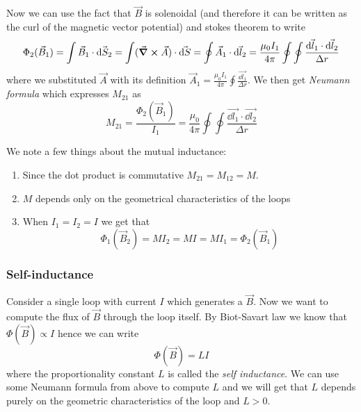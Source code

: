 \documentclass[12pt]{extarticle}
\begin{document}
Now we can use the fact that $\vec B$ is solenoidal (and therefore it can be written as the curl of the magnetic vector potential)
and stokes theorem to write
\begin{equation}
    \Phi_2(\vec B_1) = \int \vec B_1 \cdot \vec{\dd S_2} = \int (\curl \vec A) \cdot \vec{\dd S}
    = \oint \vec A_1 \cdot \vec{\dd l_2} = \frac{\mu_0 I_1}{4 \pi} \oint \oint \frac{\vec{\dd l_1} \cdot \vec{\dd l_2}}{\Delta r}
\end{equation}
where we substituted $\vec A$ with its definition $\vec A_1 = \frac{\mu_0 I_1}{4 \pi} \oint \frac{\vec{\dd l_1}}{\Delta r}$.
We then get \emph{Neumann formula} which expresses $M_{21}$ as
\begin{equation}
    M_{21} = \frac{\Phi_2(\vec B_1)}{I_1} = \frac{\mu_0 }{4 \pi} \oint \oint \frac{\vec{\dd l_1} \cdot \vec{\dd l_2}}{\Delta r}
\end{equation}

We note a few things about the mutual inductance:
\begin{enumerate}
    \item Since the dot product is commutative $M_{21} = M_{12} = M$.
    \item $M$ depends only on the geometrical characteristics of the loops
    \item When $I_1 = I_2 = I$ we get that
          \begin{equation}
              \Phi_1(\vec B_2) = M I_2 = MI = M I_1 = \Phi_2(\vec B_1)
          \end{equation}
\end{enumerate}

\subsubsection{Self-inductance}

Consider a single loop with current $I$ which generates a $\vec B$.
Now we want to compute the flux of $\vec B$ through the loop itself.
By Biot-Savart law we know that $\Phi(\vec B) \propto I$ hence we can write
\begin{equation}
    \Phi(\vec B) = L I
\end{equation}
where the proportionality constant $L$ is called the \emph{self inductance}.
We can use some Neumann formula from above to compute $L$ and we will get that $L$
depends purely on the geometric characteristics of the loop and $L > 0$.
\end{document}
